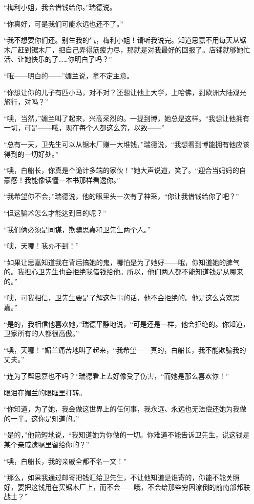 \par “梅利小姐，我会借钱给你。”瑞德说。
\par “你真好，可是我们可能永远也还不了。”
\par “我不想要你们还。别生我的气，梅利小姐！请听我说完。知道思嘉不用每天从锯木厂赶到锯木厂，把自己弄得筋疲力尽，那就是对我最好的回报了。店铺就够她忙活、让她快乐的了……你明白了吗？”
\par “哦——明白的——”媚兰说，拿不定主意。
\par “你想让你的儿子有匹小马，对不对？还想让他上大学，上哈佛，到欧洲大陆观光旅行，对吗？”
\par “噢，当然，”媚兰叫了起来，兴高采烈的。一提到博，她总是这样。“我想让他拥有一切，可是——哦，现在每个人都这么穷，以致——”
\par “总有一天，卫先生可以从锯木厂赚一大堆钱，”瑞德说，“我想看到博能拥有他应该得到的一切好处。”
\par “噢，白船长，你真是个诡计多端的家伙！”她大声说道，笑了。“迎合当妈妈的自豪感！我能像读懂一本书那样看透你。”
\par “我希望你不会，”瑞德说，他的眼里头一次有了神采，“你让我借钱给你了吧？”
\par “但这骗术怎么才能达到目的呢？”
\par “我们俩必须是同谋，欺骗思嘉和卫先生两个人。”
\par “噢，天哪！我办不到！”
\par “如果让思嘉知道我在背后搞她的鬼，哪怕是为了她好——哦，你知道她的脾气的。我担心卫先生也会拒绝我借钱给他。所以，他们两人都不能知道钱是从哪来的。”
\par “噢，可我相信，卫先生要是了解这件事的话，他不会拒绝的。他是这么喜欢思嘉。”
\par “是的，我相信他喜欢她，”瑞德平静地说，“可是还是一样，他会拒绝的。你知道，卫家所有的人都很高傲。”
\par “噢，天哪！”媚兰痛苦地叫了起来，“我希望——真的，白船长，我不能欺骗我的丈夫。”
\par “连为了帮思嘉也不吗？”瑞德看上去好像受了伤害，“而她是那么喜欢你！”
\par 眼泪在媚兰的眼眶里打转。
\par “你知道，为了她，我会做这世界上的任何事，我永远、永远也无法偿还她为我做的一半。这你是知道的。”
\par “是的，”他简短地说，“我知道她为你做的一切。你难道不能告诉卫先生，说这钱是某个亲戚遗嘱里留给你的？”
\par “噢，白船长，我的亲戚全都不名一文！”
\par “那么，如果我通过邮寄把钱汇给卫先生，不让他知道是谁寄的，你能不能关照好，要把这钱用在买锯木厂上，而不会——哦，不会给那些穷困潦倒的前南部邦联战士？”
